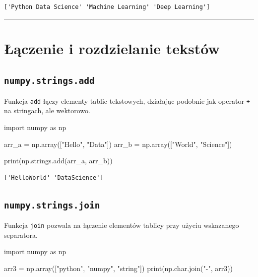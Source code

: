 \documentclass[
  letterpaper,
  DIV=11,
  numbers=noendperiod]{scrreprt}
\newenvironment{Shaded}{\begin{snugshade}}{\end{snugshade}}
\newcommand{\BuiltInTok}[1]{\textcolor[rgb]{0.00,0.23,0.31}{#1}}
\newcommand{\ImportTok}[1]{\textcolor[rgb]{0.00,0.46,0.62}{#1}}
\newcommand{\NormalTok}[1]{\textcolor[rgb]{0.00,0.23,0.31}{#1}}
\newcommand{\OperatorTok}[1]{\textcolor[rgb]{0.37,0.37,0.37}{#1}}
\newcommand{\StringTok}[1]{\textcolor[rgb]{0.13,0.47,0.30}{#1}}
\begin{document}
\begin{verbatim}
['Python Data Science' 'Machine Learning' 'Deep Learning']
\end{verbatim}

\begin{center}\rule{0.5\linewidth}{0.5pt}\end{center}

\section{Łączenie i rozdzielanie
tekstów}\label{ux142ux105czenie-i-rozdzielanie-tekstuxf3w}

\subsection{\texorpdfstring{\texttt{numpy.strings.add}}{numpy.strings.add}}\label{numpy.strings.add}

Funkcja \texttt{add} łączy elementy tablic tekstowych, działając
podobnie jak operator \texttt{+} na stringach, ale wektorowo.

\begin{Shaded}
\begin{Highlighting}[]
\ImportTok{import}\NormalTok{ numpy }\ImportTok{as}\NormalTok{ np}

\NormalTok{arr\_a }\OperatorTok{=}\NormalTok{ np.array([}\StringTok{"Hello"}\NormalTok{, }\StringTok{"Data"}\NormalTok{])}
\NormalTok{arr\_b }\OperatorTok{=}\NormalTok{ np.array([}\StringTok{"World"}\NormalTok{, }\StringTok{"Science"}\NormalTok{])}

\BuiltInTok{print}\NormalTok{(np.strings.add(arr\_a, arr\_b))}
\end{Highlighting}
\end{Shaded}

\begin{verbatim}
['HelloWorld' 'DataScience']
\end{verbatim}

\subsection{\texorpdfstring{\texttt{numpy.strings.join}}{numpy.strings.join}}\label{numpy.strings.join}

Funkcja \texttt{join} pozwala na łączenie elementów tablicy przy użyciu
wskazanego separatora.

\begin{Shaded}
\begin{Highlighting}[]
\ImportTok{import}\NormalTok{ numpy }\ImportTok{as}\NormalTok{ np}

\NormalTok{arr3 }\OperatorTok{=}\NormalTok{ np.array([}\StringTok{"python"}\NormalTok{, }\StringTok{"numpy"}\NormalTok{, }\StringTok{"string"}\NormalTok{])}
\BuiltInTok{print}\NormalTok{(np.char.join(}\StringTok{"{-}"}\NormalTok{, arr3))}
\end{Highlighting}
\end{Shaded}
\end{document}
